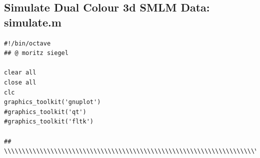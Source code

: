 \documentclass[11pt, a4paper, oneside, twocolumn]{report}
\begin{document}
\subsection{Simulate Dual Colour 3d SMLM Data: simulate.m}\label{s:c:sim}
\begin{verbatim}
#!/bin/octave
## @ moritz siegel

clear all
close all
clc
graphics_toolkit('gnuplot')
#graphics_toolkit('qt')
#graphics_toolkit('fltk')

## \\\\\\\\\\\\\\\\\\\\\\\\\\\\\\\\\\\\\\\\\\\\\\\\\\\\\\\\\\\\\\\\\\\\\\\\\\\

\end{verbatim}
\end{document}
